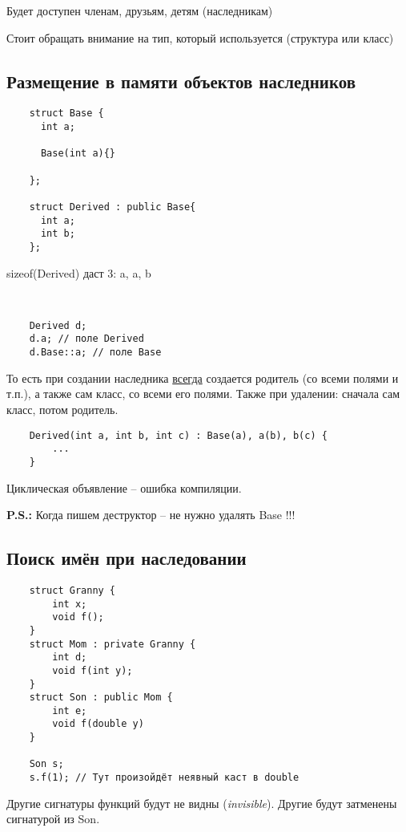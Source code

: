 \documentclass[12pt]{article}
\newcommand{\ps}{\textbf{P.S.: }}
\begin{document}
Будет доступен членам, друзьям, детям (наследникам)

Стоит обращать внимание на тип, который используется (структура или класс)

\subsection{Размещение в памяти объектов наследников}

\begin{lstlisting}
	struct Base {
	  int a;
	  
	  Base(int a){}
	  
	};
	
	struct Derived : public Base{
	  int a;
	  int b;
	};
\end{lstlisting}

sizeof(Derived) даст 3: a, a, b

\

\begin{lstlisting}
	Derived d;
	d.a; // поле Derived
	d.Base::a; // поле Base
\end{lstlisting}

То есть при создании наследника \underline{всегда} создается родитель (со всеми полями и т.п.), а также сам класс, со всеми его полями. Также при удалении: сначала сам класс, потом родитель. 

\begin{lstlisting}
	Derived(int a, int b, int c) : Base(a), a(b), b(c) {
		...
	}
\end{lstlisting}

Циклическая объявление -- ошибка компиляции. 

\ps Когда пишем деструктор -- не нужно удалять Base !!!

\subsection{Поиск имён при наследовании}

\begin{lstlisting}
	struct Granny {
		int x;
		void f();
	}
	struct Mom : private Granny {
		int d;
		void f(int y);
	}
	struct Son : public Mom {
		int e;
		void f(double y)
	}
 
 	Son s;
	s.f(1); // Тут произойдёт неявный каст в double
\end{lstlisting}

Другие сигнатуры функций будут не видны (\textit{invisible}). Другие будут затменены сигнатурой из Son. 
\end{document}
